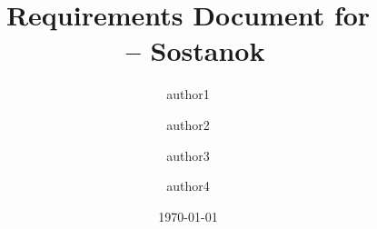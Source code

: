\documentclass{book}
\title{Requirements Document for \\
\cyrs\cyro\cyrs\cyrt\cyra\cyrn\cyro\cyrk\ -- Sostanok}
\author{author1 \and author2 \and author3 \and author4}
\date{\today}
\begin{document}

\maketitle


\printglossaries

\tableofcontents




\end{document}
